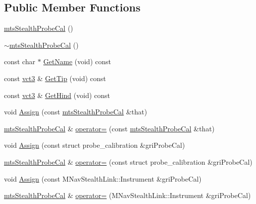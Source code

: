 \subsection*{Public Member Functions}
\begin{DoxyCompactItemize}
\item 
\hyperlink{classmts_stealth_probe_cal_a23a543dfab9d3e23f83078f7356c01c2}{mts\+Stealth\+Probe\+Cal} ()
\item 
\hyperlink{classmts_stealth_probe_cal_a7d648415188646162fde6fd4e7c198e2}{$\sim$mts\+Stealth\+Probe\+Cal} ()
\item 
const char $\ast$ \hyperlink{classmts_stealth_probe_cal_ac5d897e409c52bb39b0609be832b5280}{Get\+Name} (void) const 
\item 
const \hyperlink{vct_fixed_size_vector_types_8h_a3af82acdbf4eeb73c551909240b106ea}{vct3} \& \hyperlink{classmts_stealth_probe_cal_aef0ca077dd8812b6f8686216b649fc7e}{Get\+Tip} (void) const 
\item 
const \hyperlink{vct_fixed_size_vector_types_8h_a3af82acdbf4eeb73c551909240b106ea}{vct3} \& \hyperlink{classmts_stealth_probe_cal_abed5877dd697b53d5010c86b3c1637ec}{Get\+Hind} (void) const 
\item 
void \hyperlink{classmts_stealth_probe_cal_a1d42d1f6f752c03028a4880b1463d77d}{Assign} (const \hyperlink{classmts_stealth_probe_cal}{mts\+Stealth\+Probe\+Cal} \&that)
\item 
\hyperlink{classmts_stealth_probe_cal}{mts\+Stealth\+Probe\+Cal} \& \hyperlink{classmts_stealth_probe_cal_a72ee5ec4d3d020c08fac6d97b369fad6}{operator=} (const \hyperlink{classmts_stealth_probe_cal}{mts\+Stealth\+Probe\+Cal} \&that)
\item 
void \hyperlink{classmts_stealth_probe_cal_a40d6ebfc91323afd2a504d03f82542d1}{Assign} (const struct probe\+\_\+calibration \&gri\+Probe\+Cal)
\item 
\hyperlink{classmts_stealth_probe_cal}{mts\+Stealth\+Probe\+Cal} \& \hyperlink{classmts_stealth_probe_cal_a01847095e7208b7ca2285e0530afbfed}{operator=} (const struct probe\+\_\+calibration \&gri\+Probe\+Cal)
\item 
void \hyperlink{classmts_stealth_probe_cal_a4556d8cf2d9ecf50ed462b182abb31cc}{Assign} (const M\+Nav\+Stealth\+Link\+::\+Instrument \&gri\+Probe\+Cal)
\item 
\hyperlink{classmts_stealth_probe_cal}{mts\+Stealth\+Probe\+Cal} \& \hyperlink{classmts_stealth_probe_cal_aa2917c905dce23705b3efc6c925b1d94}{operator=} (M\+Nav\+Stealth\+Link\+::\+Instrument \&gri\+Probe\+Cal)
\item 

\end{DoxyCompactItemize}
